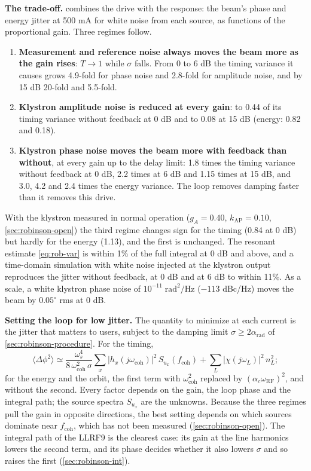 \textbf{The trade-off.}  combines the drive with the response: the beam's phase and energy jitter at 500 mA for white noise from each source, as functions of the proportional gain. Three regimes follow.

\begin{enumerate}
\item \textbf{Measurement and reference noise always moves the beam more as the gain rises}: \(T \to 1\) while \(\sigma\) falls. From 0 to 6 dB the timing variance it causes grows 4.9-fold for phase noise and 2.8-fold for amplitude noise, and by 15 dB 20-fold and 5.5-fold.
\item \textbf{Klystron amplitude noise is reduced at every gain}: to 0.44 of its timing variance without feedback at 0 dB and to 0.08 at 15 dB (energy: 0.82 and 0.18).
\item \textbf{Klystron phase noise moves the beam more with feedback than without}, at every gain up to the delay limit: 1.8 times the timing variance without feedback at 0 dB, 2.2 times at 6 dB and 1.15 times at 15 dB, and 3.0, 4.2 and 2.4 times the energy variance. The loop removes damping faster than it removes this drive.
\end{enumerate}

With the klystron measured in normal operation (\(g_A = 0.40\), \(k_\text{AP} = 0.10\), \cref{sec:robinson-open}) the third regime changes sign for the timing (0.84 at 0 dB) but hardly for the energy (1.13), and the first is unchanged. The resonant estimate \eqref{eq:rob-var} is within 1\% of the full integral at 0 dB and above, and a time-domain simulation with white noise injected at the klystron output reproduces the jitter without feedback, at 0 dB and at 6 dB to within 11\%. As a scale, a white klystron phase noise of \(10^{-11}\;\text{rad}^2/\text{Hz}\) (\(-113\) dBc/Hz) moves the beam by \(0.05^\circ\) rms at 0 dB.

\textbf{Setting the loop for low jitter.} The quantity to minimize at each current is the jitter that matters to users, subject to the damping limit \(\sigma \ge 2\alpha_\text{rad}\) of \cref{sec:robinson-procedure}. For the timing,
\begin{equation}\label{eq:rob-target}
\langle\Delta\phi^2\rangle \simeq \frac{\omega_s^4}{8\,\omega_\text{coh}^2\,\sigma}\sum_x \lvert h_x(j\omega_\text{coh})\rvert^2\,S_{u_x}(f_\text{coh}) + \sum_L \lvert\chi(j\omega_L)\rvert^2\,n_L^2 ;
\end{equation}
for the energy and the orbit, the first term with \(\omega_\text{coh}^2\) replaced by \((\alpha_c\omega_\text{RF})^2\), and without the second. Every factor depends on the gain, the loop phase and the integral path; the source spectra \(S_{u_x}\) are the unknowns. Because the three regimes pull the gain in opposite directions, the best setting depends on which sources dominate near \(f_\text{coh}\), which has not been measured (\cref{sec:robinson-open}). The integral path of the LLRF9 is the clearest case: its gain at the line harmonics lowers the second term, and its phase decides whether it also lowers \(\sigma\) and so raises the first (\cref{sec:robinson-int}).

